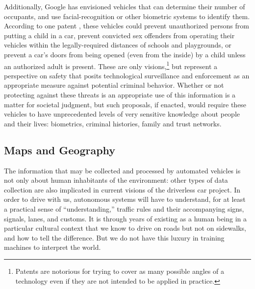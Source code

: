Additionally, Google has envisioned vehicles that can determine their number of
occupants, and use facial-recognition or other biometric systems to
identify them. According to one patent \cite{predictPatent}, these vehicles could prevent
unauthorized persons from putting a child in a car, prevent convicted
sex offenders from operating their vehicles within the
legally-required distances of schools and playgrounds, or prevent a
car's doors from being opened (even from the inside) by a child unless
an authorized adult is present. These are only visions,\footnote{Patents
are notorious for trying to cover as many possible angles of a
technology even if they are not intended to be applied in practice.} 
but represent a perspective on safety 
that posits technological surveillance and enforcement as an
appropriate measure against potential criminal behavior. Whether or not protecting
against these threats is an appropriate use of this information is a
matter for societal judgment, but such proposals, if enacted, would
require these vehicles to have unprecedented levels of very sensitive
knowledge about people and their lives: biometrics, criminal
histories, family and trust networks. 





\subsection{Maps and Geography}



The information that may be collected and processed by automated
vehicles is not only about human inhabitants of the environment: other
types of data collection are also implicated in current
visions of the driverless car project. In order to drive with us,
autonomous systems will have to understand,
for at least a practical sense of ``understanding,'' traffic rules and
their accompanying signs, signals, lanes, and customs. It is through
years of existing as a human being
in a particular cultural context that we know to drive on roads but
not on sidewalks, and how to tell the difference. But we do not have
this luxury in training machines to interpret the world.


